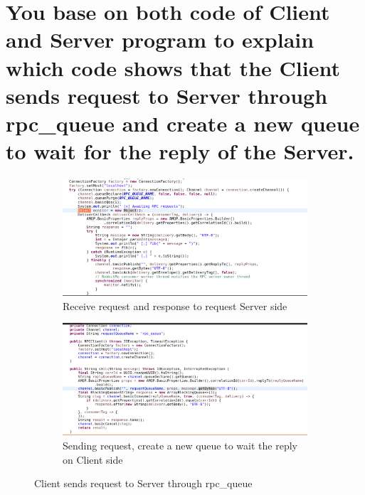 \documentclass[11pt,a4paper]{article}
\begin{document}
	\section{You base on both code of Client and Server program to explain which code shows that the Client sends request to Server through rpc\_queue and create a new queue to wait for the reply of the Server.}
	\begin{figure}[h!]
		\centering
  		\begin{subfigure}[b]{0.4\linewidth}
  		\includegraphics[width=\linewidth]{server-rpc-queue.png}
    		\caption{Receive request and response to request Server side}
  		\end{subfigure}
  		\begin{subfigure}[b]{0.4\linewidth}
    		\includegraphics[width=\linewidth]{client-rpc-queue.png}
    		\caption{Sending request, create a new queue to wait the reply on Client side}
  		\end{subfigure}
  		\caption{Client sends request to Server through rpc\_queue}
  		\label{fig:rpc}
	\end{figure}
	
\end{document}
